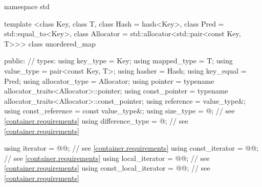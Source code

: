 %
\begin{codeblock}
namespace std {
  template <class Key,
            class T,
            class Hash = hash<Key>,
            class Pred = std::equal_to<Key>,
            class Allocator = std::allocator<std::pair<const Key, T>>>
  class unordered_map {
  public:
    // types:
    using key_type             = Key;
    using mapped_type          = T;
    using value_type           = pair<const Key, T>;
    using hasher               = Hash;
    using key_equal            = Pred;
    using allocator_type       = Allocator;
    using pointer              = typename allocator_traits<Allocator>::pointer;
    using const_pointer        = typename allocator_traits<Allocator>::const_pointer;
    using reference            = value_type&;
    using const_reference      = const value_type&;
    using size_type            = @\impdef@; // see \ref{container.requirements}
    using difference_type      = @\impdef@; // see \ref{container.requirements}

    using iterator             = @@; // see \ref{container.requirements}
    using const_iterator       = @@; // see \ref{container.requirements}
    using local_iterator       = @@; // see \ref{container.requirements}
    using const_local_iterator = @@; // see \ref{container.requirements}

}}
\end{codeblock}
